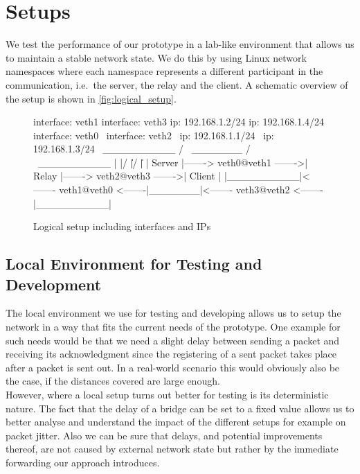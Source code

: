 \section{Setups}\label{sec:setups}

We test the performance of our prototype in a lab-like environment that 
allows us to maintain a stable network state.
We do this by using Linux network namespaces where each namespace represents
a different participant in the communication, i.e.~the server, the relay and the client.
A schematic overview of the setup is shown in \autoref{fig:logical_setup}.

\vspace{0.5cm}
\begin{figure}[H]
\centering
\begin{myverbatim}
        
                                    interface: veth1                      interface: veth3
                                    ip: 192.168.1.2/24                    ip: 192.168.1.4/24
              interface: veth0       \              interface: veth2       \
              ip: 192.168.1.1/24      \             ip: 192.168.1.3/24      \
 __________  /                         \  _______  /                         \  __________ 
|          |/                           \|       |/                           \|          |
|  Server  |-------> veth0@veth1 ------->| Relay |-------> veth2@veth3 ------->|  Client  |
|__________|<------- veth1@veth0 <-------|_______|<------- veth3@veth2 <-------|__________|
        
\end{myverbatim}
\caption{Logical setup including interfaces and IPs}\label{fig:logical_setup}
\end{figure}
\vspace{0.5cm}

\subsection{Local Environment for Testing and Development}\label{subsec:namespace_environment}
The local environment we use for testing and developing allows us to setup the network in a way 
that fits the current needs of the prototype.
One example for such needs would be that we need a slight delay between sending a packet and 
receiving its acknowledgment since the registering of a sent packet takes place after a packet 
is sent out. 
In a real-world scenario this would obviously also be the case, if the distances covered 
are large enough.
\\
However, where a local setup turns out better for testing is its deterministic nature.
The fact that the delay of a bridge can be set to a fixed value allows us to better 
analyse and understand the impact of the different setups for example on packet jitter.
Also we can be sure that delays, and potential improvements thereof, are not caused by external
network state but rather by the immediate forwarding our approach introduces.


